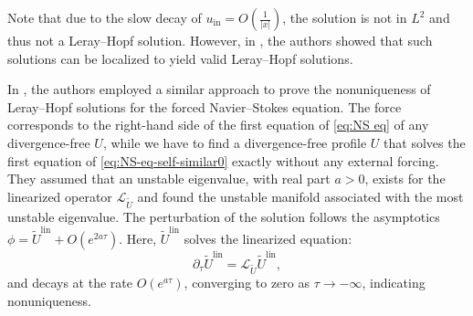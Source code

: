 \documentclass[11pt,a4paper]{article}
\numberwithin{equation}{section}
\newcommand{\tmop}[1]{\ensuremath{\operatorname{#1}}}
\begin{document}
\begin{remark}
  Note that due to the slow decay of $u_{\tmop{in}} = O ( \frac{1}{| x |}
  )$, the solution is not in $L^2$ and thus not a
  Leray--Hopf solution. However, in {\cite{jia2015incompressible}}, the authors
  showed that such solutions can be localized to yield valid Leray--Hopf
  solutions. 
\end{remark}

In {\cite{albritton2022non}}, the authors employed a similar approach to prove the nonuniqueness of Leray--Hopf solutions for the forced Navier--Stokes
equation. The force corresponds to the right-hand side of the first equation of \eqref{eq:NS eq} of any divergence-free $U$, while we have to find a divergence-free profile $U$ that solves the first equation of \eqref{eq:NS-eq-self-similar0} exactly without any external forcing. They assumed that an unstable eigenvalue,
with real part $a > 0$, exists for the linearized operator
$\mathcal{L}_{\widetilde{U}}$ and found the unstable manifold associated with the
most unstable eigenvalue. The perturbation of the solution follows the asymptotics
$\phi = \widetilde{U}^{\tmop{lin}} + O (e^{ 2 a \tau})$. Here,
$\widetilde{U}^{\tmop{lin}}$ solves the linearized equation:
\begin{equation}
    \partial_{\tau} \widetilde{U}^{\tmop{lin}} =\mathcal{L}_{\widetilde{U}} 
   \widetilde{U}^{\tmop{lin}} , \label{main lin}
\end{equation} 
and decays at the rate $O (e^{ a \tau})$, converging to zero as $\tau
\to - \infty$, indicating nonuniqueness.
\end{document}
